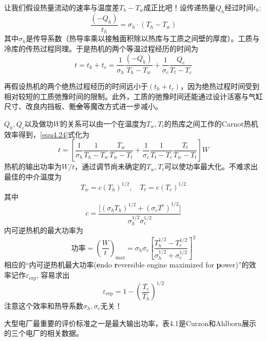 让我们假设热量流动的速率与温度差$T_h - T_w$成正比吧！设传递热量$Q_h$经过时间$t_h$:
\begin{equation}
	\frac{(-Q_h)}{t_h} = \sigma_h \cdot (T_h - T_w)
\label{equ4.23}
\end{equation}
其中$\sigma_h$是传导系数（热导率乘以接触面积除以热库与工质之间壁的厚度）。工质与冷库的传热过程同理。于是热机的两个等温过程经历的时间为
\begin{equation}
	t = t_h + t_c = \frac{1}{\sigma_h} \frac{(-Q_h)}{T_h - T_w} + \frac{1}{\sigma_c} \frac{Q_c}{T_t - T_c}
\label{equ4.24}
\end{equation}

再假设热机的两个绝热过程经历的时间远小于$(t_h + t_c)$，因为绝热过程时间受到相对较短的工质弛豫时间的限制。此外，工质的弛豫时间还能通过设计活塞与气缸尺寸、改良内挡板、\sout{氪金}等魔改方式进一步减小。

$Q_h, Q_c$以及做功$W$的关系可以由一个在温度为$T_w, T_t$的热库之间工作的Carnot热机效率得到，\eqref{equ4.24}式化为
\begin{equation}
	t = \left[ \frac{1}{\sigma_h} \frac{1}{T_h - T_w} \frac{T_w}{T_w - T_t} + \frac{1}{\sigma_c} \frac{1}{T_t - T_c} \frac{T_t}{T_w - T_t} \right] W 
\label{equ4.25}
\end{equation}
热机的输出功率为$W/t$，通过调节尚未确定的$T_w, T_t$可以使功率最大化。不难求出最佳的中介温度为
\begin{equation}
	T_w = c (T_h)^{1/2}, \quad T_t = c(T_c)^{1/2}
\label{equ4.26}
\end{equation}
其中 
\begin{equation}
	c = \frac{ \Big[ (\sigma_h T_h)^{1/2} + (\sigma_c T^c)^{1/2} \Big] }{ \sigma_h^{1/2} \sigma_c^{1/2} }
\label{equ4.27}
\end{equation}
内可逆热机的最大功率为
\begin{equation}
	\text{功率} = \left( \frac{W}{t} \right)_{\text{max}} = \sigma_h \sigma_c \left[ \frac{T_h^{1/2} - T_c^{1/2} }{ \sigma_h^{1/2} + \sigma_c^{1/2} } \right]^2
\label{equ4.28}
\end{equation}
相应的“内可逆热机最大功率({\bf e}ndo {\bf r}eversible  engine maximized for {\bf p}ower)”的效率记作$\varepsilon_{\text{erp}}$, 容易求出
\begin{equation}
	\varepsilon_{\text{erp}} = 1 - \left( \frac{T_c}{T_h} \right)^{1/2}
\label{equ4.29}
\end{equation}
注意这个效率和热导系数$\sigma_h, \sigma_c$无关！

大型电厂最重要的评价标准之一是最大输出功率，表4.1是Curzon和Ahlborn展示的三个电厂的相关数据。


